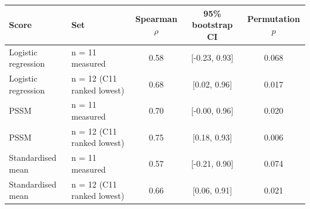 \begin{tabular}{@{}llccc@{}}\toprule
Score & Set & Spearman $\rho$ & 95\% bootstrap CI & Permutation $p$ \\\midrule
Logistic regression & n = 11 measured & 0.58 & [-0.23, 0.93] & 0.068 \\
Logistic regression & n = 12 (C11 ranked lowest) & 0.68 & [0.02, 0.96] & 0.017 \\
PSSM & n = 11 measured & 0.70 & [-0.00, 0.96] & 0.020 \\
PSSM & n = 12 (C11 ranked lowest) & 0.75 & [0.18, 0.93] & 0.006 \\
Standardised mean & n = 11 measured & 0.57 & [-0.21, 0.90] & 0.074 \\
Standardised mean & n = 12 (C11 ranked lowest) & 0.66 & [0.06, 0.91] & 0.021 \\
\bottomrule\end{tabular}
